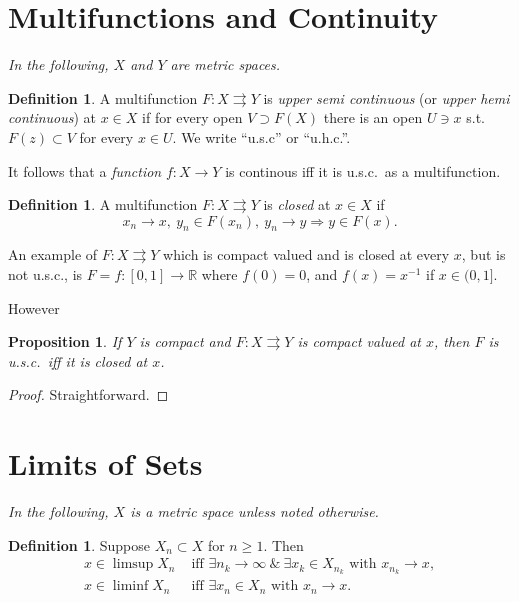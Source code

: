 \documentclass[a4paper]{amsart}
\theoremstyle{plain}
\newtheorem{proposition}[theorem]{Proposition}
\theoremstyle{definition}
\newtheorem{definition}[theorem]{Definition}%
\theoremstyle{remark}
\begin{document}
\section{\textbf{Multifunctions and Continuity}}  \emph{In the following, $ X $ and $ Y $ are metric spaces.}

\begin{definition} A multifunction $ F:X \rightrightarrows Y $  is \emph{upper semi continuous}
(or \emph{upper hemi continuous}) at $ x \in X $ if for every open $ V \supset F(X) $ there is an open $ U \ni x $ s.t.\ $ F(z) \subset V $ for every $ x \in U $.  We write ``u.s.c'' or ``u.h.c.''.
\end{definition}

It follows that a \emph{function} $ f :X \to Y $ is continous iff it is u.s.c.\ as a multifunction.

\begin{definition} A multifunction $ F:X \rightrightarrows Y $ is \emph{closed} at $ x \in X $ if 
\[
x_n \to x,\ y_n \in F(x_n),\ y_n \to y \Longrightarrow y \in F(x).
\]
\end{definition} 

An example of $ F:X \rightrightarrows Y $ which is compact valued and is closed at every $ x $, but is not u.s.c.,  is $F= f:[0,1]\to \mathbb{R} $ where $ f(0) = 0 $, and $ f(x) = x^{-1} $ if $ x\in(0,1] $.

However

\begin{proposition} 
If $ Y $ is compact and $   F:X \rightrightarrows Y $ is compact valued at $ x $, then $ F $ is u.s.c.\ iff it is closed at $ x $.
\end{proposition}

\begin{proof} Straightforward. \end{proof} 



\section{\textbf{Limits of Sets}}
  \emph{In the following, $ X $ is a  metric space unless noted otherwise.}

\begin{definition} Suppose $ X_n \subset X $ for $ n\geq 1 $. Then
\begin{align*}
x \in \limsup X_n &\text{ iff } \exists   n_k \to \infty\ \& \  \exists x_k \in X_{n_k} \text{ with }  x_{n_k}\to x ,  \\
x \in \liminf X_n &\text{ iff }   \exists x_n  \in X_{n } \text{ with }   x_n \to x.
\end{align*} 
\end{definition} 
 
\end{document}
